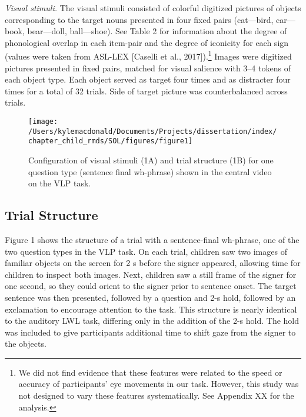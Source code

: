 \documentclass[oneside]{report}
\begin{document}
\emph{Visual stimuli.} The visual stimuli consisted of colorful
digitized pictures of objects corresponding to the target nouns
presented in four fixed pairs (cat---bird, car---book, bear---doll,
ball---shoe). See Table 2 for information about the degree of
phonological overlap in each item-pair and the degree of iconicity for
each sign (values were taken from ASL-LEX {[}Caselli et al.,
2017{]}).\footnote{We did not find evidence that these features were
  related to the speed or accuracy of participants' eye movements in our
  task. However, this study was not designed to vary these features
  systematically. See Appendix XX for the analysis.} Images were
digitized pictures presented in fixed pairs, matched for visual salience
with 3--4 tokens of each object type. Each object served as target four
times and as distracter four times for a total of 32 trials. Side of
target picture was counterbalanced across trials.
\begin{figure}[t]

{\centering \texttt{[image: /Users/kylemacdonald/Documents/Projects/dissertation/index/chapter\_child\_rmds/SOL/figures/figure1]} 

}

\caption[Stimuli in the Visual Language Processing Task used in Experiment 1.1]{Configuration of visual stimuli (1A) and trial structure (1B) for one question type (sentence final wh-phrase) shown in the central video on the VLP task.}\label{fig:sol-trial-fig}
\end{figure}
\subsection{Trial Structure}\label{trial-structure}

Figure 1 shows the structure of a trial with a sentence-final wh-phrase,
one of the two question types in the VLP task. On each trial, children
saw two images of familiar objects on the screen for 2 s before the
signer appeared, allowing time for children to inspect both images.
Next, children saw a still frame of the signer for one second, so they
could orient to the signer prior to sentence onset. The target sentence
was then presented, followed by a question and 2-s hold, followed by an
exclamation to encourage attention to the task. This structure is nearly
identical to the auditory LWL task, differing only in the addition of
the 2-s hold. The hold was included to give participants additional time
to shift gaze from the signer to the objects.
\end{document}
